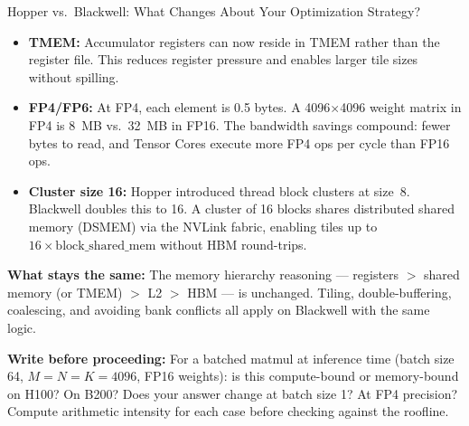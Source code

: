\begin{thinkfirst}{Hopper vs.\ Blackwell: What Changes About Your Optimization Strategy?}
\begin{itemize}
\begin{center}
\end{center}

\smallskip
\noindent\textit{Conceptual roofline (not to log-scale). Decode-phase operations cluster in the bandwidth-bound regime; training matmuls cluster in the compute-bound regime. The gap between H100 and B200 ceilings is largest in the compute-bound region.}

  \item \textbf{TMEM:} Accumulator registers can now reside in TMEM rather than the register file. This reduces register pressure and enables larger tile sizes without spilling.
  \item \textbf{FP4/FP6:} At FP4, each element is 0.5 bytes. A 4096$\times$4096 weight matrix in FP4 is 8~MB vs.\ 32~MB in FP16. The bandwidth savings compound: fewer bytes to read, and Tensor Cores execute more FP4 ops per cycle than FP16 ops.
  \item \textbf{Cluster size 16:} Hopper introduced thread block clusters at size~8. Blackwell doubles this to 16. A cluster of 16 blocks shares distributed shared memory (DSMEM) via the NVLink fabric, enabling tiles up to $16 \times \text{block\_shared\_mem}$ without HBM round-trips.
\end{itemize}

\textbf{What stays the same:} The memory hierarchy reasoning --- registers $>$ shared memory (or TMEM) $>$ L2 $>$ HBM --- is unchanged. Tiling, double-buffering, coalescing, and avoiding bank conflicts all apply on Blackwell with the same logic.

\textbf{Write before proceeding:} For a batched matmul at inference time (batch size 64, $M=N=K=4096$, FP16 weights): is this compute-bound or memory-bound on H100? On B200? Does your answer change at batch size 1? At FP4 precision? Compute arithmetic intensity for each case before checking against the roofline.
\end{thinkfirst}

